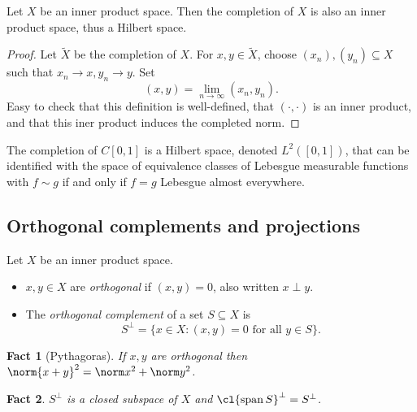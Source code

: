 \documentclass[a4paper]{article}
\newtheorem*{fact}{Fact}
\DeclareMathOperator{\spans}{span} %
\begin{document}
\begin{proposition}
  Let \(X\) be an inner product space. Then the completion of \(X\) is also an inner product space, thus a Hilbert space.
\end{proposition}

\begin{proof}
  Let \(\tilde X\) be the completion of \(X\). For \(x, y \in \tilde X\), choose \((x_n), (y_n) \subseteq X\) such that \(x_n \to x, y_n \to y\). Set
  \[
    (x, y) = \lim_{n \to \infty} (x_n, y_n).
  \]
  Easy to check that this definition is well-defined, that \((\cdot, \cdot)\) is an inner product, and that this iner product induces the completed norm.
\end{proof}

\begin{eg}
  The completion of \(C[0, 1]\) is a Hilbert space, denoted \(L^2([0, 1])\), that can be identified with the space of equivalence classes of Lebesgue measurable functions with \(f \sim g\) if and only if \(f = g\) Lebesgue almost everywhere.
\end{eg}

\subsection{Orthogonal complements and projections}

\begin{definition}
  Let \(X\) be an inner product space.
  \begin{itemize}
  \item \(x, y \in X\) are \emph{orthogonal} if \((x, y) = 0\), also written \(x \perp y\).
  \item The \emph{orthogonal complement} of a set \(S \subseteq X\) is
    \[
      S^\perp = \{x \in X: (x, y) = 0 \text{ for all } y \in S\}.
    \]
  \end{itemize}
\end{definition}

\begin{fact}[Pythagoras]
  If \(x, y\) are orthogonal then \(\norm{x + y}^2 = \norm x^2 + \norm y^2\).
\end{fact}

\begin{fact}
  \(S^\perp\) is a closed subspace of \(X\) and \(\cl{\spans S}^\perp = S^\perp\).
\end{fact}
\end{document}
